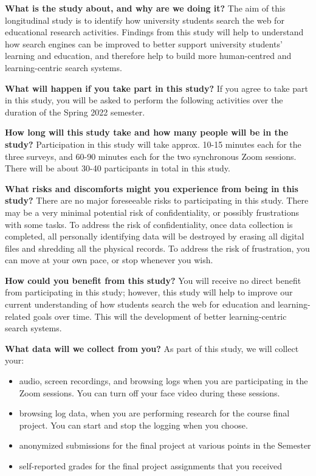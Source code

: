 \documentclass[letterpaper, nobind]{templates/ociamthesis}
\providecommand{\tightlist}{%
  \setlength{\itemsep}{0pt}\setlength{\parskip}{0pt}}
\begin{document}
\textbf{What is the study about, and why are we doing it?}
The aim of this longitudinal study is to identify how university students search the web for educational research activities. Findings from this study will help to understand how search engines can be improved to better support university students' learning and education, and therefore help to build more human-centred and learning-centric search systems.

\textbf{What will happen if you take part in this study?}
If you agree to take part in this study, you will be asked to perform the following activities over the duration of the Spring 2022 semester.

\textbf{How long will this study take and how many people will be in the study?}
Participation in this study will take approx. 10-15 minutes each for the three surveys, and 60-90 minutes each for the two synchronous Zoom sessions. There will be about 30-40 participants in total in this study.

\textbf{What risks and discomforts might you experience from being in this study?}
There are no major foreseeable risks to participating in this study. There may be a very minimal potential risk of confidentiality, or possibly frustrations with some tasks. To address the risk of confidentiality, once data collection is completed, all personally identifying data will be destroyed by erasing all digital files and shredding all the physical records. To address the risk of frustration, you can move at your own pace, or stop whenever you wish.

\textbf{How could you benefit from this study?}
You will receive no direct benefit from participating in this study; however, this study will help to improve our current understanding of how students search the web for education and learning-related goals over time. This will the development of better learning-centric search systems.

\textbf{What data will we collect from you?}
As part of this study, we will collect your:

\begin{itemize}
\tightlist
\item
  audio, screen recordings, and browsing logs when you are participating in the Zoom sessions. You can turn off your face video during these sessions.
\item
  browsing log data, when you are performing research for the course final project. You can start and stop the logging when you choose.
\item
  anonymized submissions for the final project at various points in the Semester
\item
  self-reported grades for the final project assignments that you received
\end{itemize}
\end{document}
